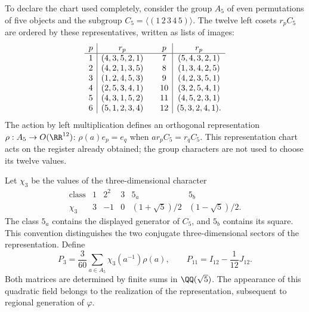 To declare the chart used completely, consider the group
\(A_5\) of even permutations of five objects and the subgroup
\(C_5=\langle(1\,2\,3\,4\,5)\rangle\). The twelve left cosets
\(r_pC_5\) are ordered by these representatives, written as
lists of images:
\[
\begin{array}{c|c@{\qquad}c|c}
p&r_p&p&r_p\\ \hline
1&(4,3,5,2,1)&7&(5,4,3,2,1)\\
2&(4,2,1,3,5)&8&(1,3,4,2,5)\\
3&(1,2,4,5,3)&9&(4,2,3,5,1)\\
4&(2,5,3,4,1)&10&(3,2,5,4,1)\\
5&(4,3,1,5,2)&11&(4,5,2,3,1)\\
6&(5,1,2,3,4)&12&(5,3,2,4,1).
\end{array}
\]
The action by left multiplication defines an orthogonal
representation \(\rho:A_5\to O(\RR^{12})\):
\(\rho(a)e_p=e_q\) when \(ar_pC_5=r_qC_5\).
This representation chart acts on the register already obtained;
the group characters are not used to choose its twelve values.

Let \(\chi_3\) be the values of the three-dimensional character
\[
\begin{array}{c|ccccc}
\text{class}&1&2^2&3&5_a&5_b\\ \hline
\chi_3&3&-1&0&(1+\sqrt5)/2&(1-\sqrt5)/2.
\end{array}
\]
The class \(5_a\) contains the displayed generator of \(C_5\), and
\(5_b\) contains its square. This convention distinguishes the two
conjugate three-dimensional sectors of the representation. Define
\begin{equation}
 P_3=\frac3{60}\sum_{a\in A_5}\chi_3(a^{-1})\rho(a),
 \qquad P_{11}=I_{12}-\frac1{12}J_{12}.
 \label{x_reciprocidad:eq:k-proyectores-incidencia}
\end{equation}
Both matrices are determined by finite sums in
\(\QQ(\sqrt5)\). The appearance of this quadratic field belongs
to the realization of the representation, subsequent to regional
generation of \(\varphi\).

